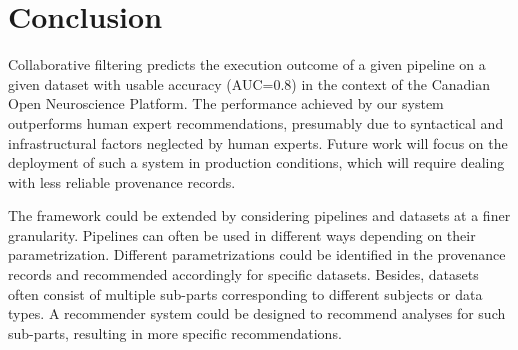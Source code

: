 \documentclass[conference]{IEEEtran}
\begin{document}
\section{Conclusion}


Collaborative filtering predicts the execution outcome of a given pipeline
on a given dataset with usable accuracy (AUC=0.8) in the context of the
Canadian Open Neuroscience Platform. The performance achieved by our system
outperforms
human expert recommendations, presumably due to syntactical and
infrastructural factors neglected by human experts. Future work will focus
on the deployment of such a system in production conditions, which will require
dealing with less reliable provenance records.

The framework could be extended by considering pipelines and datasets 
at a finer granularity. Pipelines can often be used in different ways 
depending on their parametrization. Different parametrizations could 
be identified in the provenance records and recommended accordingly 
for specific datasets. Besides, datasets often consist of multiple 
sub-parts corresponding to different subjects or data types. A recommender 
system could be designed to recommend analyses for such sub-parts, 
resulting in more specific recommendations.







\end{document}
